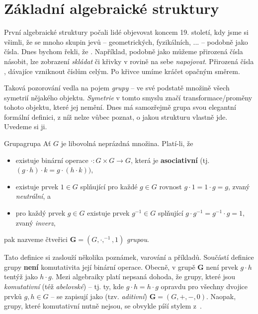 \section{Základní algebraické struktury}
\label{sec:zakladni-algebraicke-struktury}

První algebraické struktury počali lidé objevovat koncem 19. století, kdy jsme
si všimli, že se mnoho skupin jevů -- geometrických, fyzikálních, ... --
 podobně jako čísla. Dnes bychom řekli, že . Například, podobně jako můžeme přirozená čísla násobit, lze zobrazení
\emph{skládat} či křivky v rovině na sebe \emph{napojovat}. Přirozená čísla
, dávajíce vzniknout číslům celým. Po křivce umíme kráčet opačným
směrem.

Taková pozorování vedla na pojem \emph{grupy} -- ve své podstatě množině všech
symetrií nějakého objektu. \emph{Symetrie} v tomto smyslu značí
transformace/proměny tohoto objektu, které jej nemění. Dnes má samozřejmě grupa
svou elegantní formální definici, z níž nelze vůbec poznat, o jakou strukturu
vlastně jde. Uvedeme si ji.

\begin{definition}{Grupa}{grupa}
 Ať $G$ je libovolná neprázdná množina. Platí-li, že
 \begin{itemize}
  \item existuje binární operace $ \cdot :G \times G \to G$, která je
  \textbf{asociativní} (tj. $(g \cdot h) \cdot k = g \cdot (h \cdot k))$,
 \item existuje prvek $1 \in G$ splňující pro každé $g \in G$ rovnost $g \cdot 1
  = 1 \cdot g = g$, zvaný \emph{neutrální}, a
 \item pro každý prvek $g \in G$ existuje prvek $g^{-1} \in G$ splňující
  $g \cdot g^{-1} = g^{-1} \cdot g = 1$, zvaný \emph{inverz},
 \end{itemize}
 pak nazveme čtveřici $\mathbf{G} = (G, \cdot ,^{-1},1)$ \emph{grupou}.
\end{definition}
Tato definice si zaslouží několika poznámek, varování a příkladů. Součástí
definice grupy \textbf{není} komutativita její binární operace. Obecně, v grupě
$\mathbf{G}$ není prvek $g \cdot h$ tentýž jako $h \cdot g$. Mezi algebraiky
platí nepsaná dohoda, že grupy, které jsou \emph{komutativní} (též
\emph{abelovské}) -- tj. ty, kde $g \cdot h = h \cdot g$ opravdu pro všechny
dvojice prvků $g,h \in G$ -- se zapisují jako (tzv. \emph{aditivní}) $\mathbf{G}
= (G,+,-,0)$. Naopak, grupy, které komutativní nutně nejsou, se obvykle píší
stylem z~.

